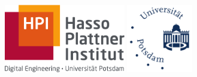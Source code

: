 \begin{titlepage}
    \begin{addmargin}[-0.25cm]{-0.25cm}
    \begin{center}
        \large  

        \hfill
        
        \vspace{1cm}
        
        \includegraphics[height=3cm]{figures/hpi_logo.pdf} 
        \hspace{15mm}
        \includegraphics[height=3cm]{figures/up_logo.pdf} \\ \bigskip
		
		\vspace{25mm}

		 \\ \bigskip

        \begingroup
            \color{Maroon}\spacedallcaps{\myTitle} \\ \bigskip
        \endgroup
        
        \begingroup
            \color{Maroon}\spacedlowsmallcaps{\myGermanTitle} \\
        \endgroup

		\vspace{1cm}

        \spacedallcaps{\myName} \\
        
        \vspace{2cm}
        
         \\ \smallskip
        \myProf \\ \smallskip
        \bigskip
        

\end{center}
\end{addmargin}
\end{titlepage}
